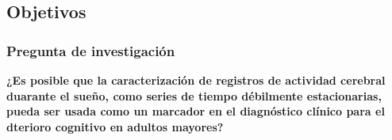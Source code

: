 \documentclass{beamer}
\begin{document}

\subsection{Objetivos}

\begin{frame}\frametitle{Pregunta de investigaci\'on}
\textbf{
¿Es posible que la caracterizaci\'on de registros de actividad cerebral duarante el sue\~no, 
como series de tiempo d\'ebilmente 
estacionarias, pueda ser usada como un marcador en el diagn\'ostico cl\'inico para el dterioro 
cognitivo en adultos mayores?
}

\end{frame}


%
%
%

\end{document}
